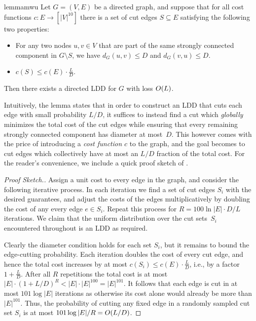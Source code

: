 \documentclass[letterpaper,11pt]{article}
\begin{document}
\begin{restatable}{lemma}{mwu} \label{lem:mwu}
Let $G = (V, E)$ be a directed graph, and suppose that for all cost functions $c : E \to [|V|^{10}]$ there is a set of cut edges $S \subseteq E$ satisfying the following two properties:
\begin{itemize}
	\item For any two nodes $u, v \in V$ that are part of the same strongly connected component in $G \setminus S$, we have $d_G(u, v) \leq D$ and $d_G(v, u) \leq D$.
	\item $c(S) \leq c(E) \cdot \frac{L}{D}$.
\end{itemize}
Then there exists a directed LDD for $G$ with loss $O(L)$.
\end{restatable}

Intuitively, the lemma states that in order to construct an LDD that cuts each edge with small probability $L / D$, it suffices to instead find a cut which \emph{globally} minimizes the total cost of the cut edges while ensuring that every remaining strongly connected component has diameter at most~$D$. This however comes with the price of introducing a \emph{cost function $c$} to the graph, and the goal becomes to cut edges which collectively have at most an $L / D$ fraction of the total cost. For the reader's convenience, we include a quick proof sketch of .

\begin{proof}[Proof Sketch.]
	Assign a unit cost to every edge in the graph, and consider the following iterative process. In each iteration we find a set of cut edges $S_i$ with the desired guarantees, and adjust the costs of the edges multiplicatively by doubling the cost of any every edge $e \in S_i$. Repeat this process for $R = 100\ln |E| \cdot D/L$ iterations. We claim that the uniform distribution over the cut sets~$S_i$ encountered throughout is an LDD as required. 

	Clearly the diameter condition holds for each set $S_i$, but it remains to bound the edge-cutting probability. Each iteration doubles the cost of every cut edge, and hence the total cost increases by at most $c(S_i) \leq c(E) \cdot \frac{L}{D}$, i.e., by a factor $1 + \frac{L}{D}$. After all $R$ repetitions the total cost is at most $|E| \cdot (1+L/D)^R < |E| \cdot |E|^{100} = |E|^{101}$. It follows that each edge is cut in at most $101 \log |E|$ iterations as otherwise its cost alone would already be more than $|E|^{101}$. Thus, the probability of cutting any fixed edge in a randomly sampled cut set $S_i$ is at most $101 \log |E| / R = O(L / D)$.
\end{proof}
\end{document}
